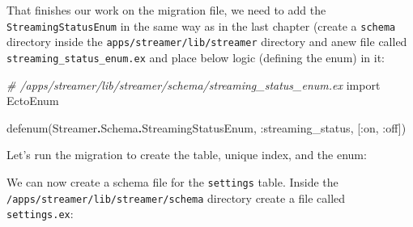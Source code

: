 \documentclass[
  oneside]{book}
\newenvironment{Shaded}{\begin{snugshade}}{\end{snugshade}}
\newcommand{\CommentTok}[1]{\textcolor[rgb]{0.56,0.35,0.01}{\textit{#1}}}
\newcommand{\ConstantTok}[1]{\textcolor[rgb]{0.00,0.00,0.00}{#1}}
\newcommand{\ExtensionTok}[1]{#1}
\newcommand{\ImportTok}[1]{#1}
\newcommand{\NormalTok}[1]{#1}
\newcommand{\OperatorTok}[1]{\textcolor[rgb]{0.81,0.36,0.00}{\textbf{#1}}}
\newcommand{\StringTok}[1]{\textcolor[rgb]{0.31,0.60,0.02}{#1}}
\newcommand{\VariableTok}[1]{\textcolor[rgb]{0.00,0.00,0.00}{#1}}
\begin{document}
That finishes our work on the migration file, we need to add the \texttt{StreamingStatusEnum} in the same way as in the last chapter (create a \texttt{schema} directory inside the \texttt{apps/streamer/lib/streamer} directory and anew file called \texttt{streaming\_status\_enum.ex} and place below logic (defining the enum) in it:

\begin{Shaded}
\begin{Highlighting}[]
\CommentTok{\# /apps/streamer/lib/streamer/schema/streaming\_status\_enum.ex}
\ImportTok{import} \ConstantTok{EctoEnum}

\NormalTok{defenum(}\ConstantTok{Streamer}\OperatorTok{.}\ConstantTok{Schema}\OperatorTok{.}\ConstantTok{StreamingStatusEnum}\NormalTok{, }\VariableTok{:streaming\_status}\NormalTok{, [}\VariableTok{:on}\NormalTok{, }\VariableTok{:off}\NormalTok{])}
\end{Highlighting}
\end{Shaded}

Let's run the migration to create the table, unique index, and the enum:

\begin{Shaded}
\end{Shaded}

We can now create a schema file for the \texttt{settings} table. Inside the \texttt{/apps/streamer/lib/streamer/schema} directory create a file called \texttt{settings.ex}:
\end{document}
